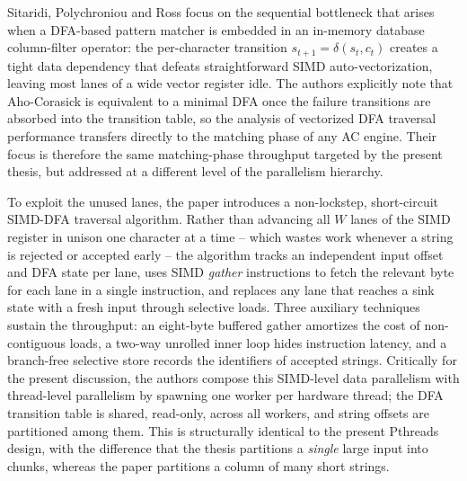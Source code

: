 
Sitaridi, Polychroniou and Ross \cite{Sitaridi2016SIMD} focus on the sequential bottleneck that arises when a DFA-based pattern matcher is embedded in an in-memory database column-filter operator: the per-character transition $s_{t+1} = \delta(s_t, c_t)$ creates a tight data dependency that defeats straightforward SIMD auto-vectorization, leaving most lanes of a wide vector register idle. The authors explicitly note that Aho-Corasick is equivalent to a minimal DFA once the failure transitions are absorbed into the transition table, so the analysis of vectorized DFA traversal performance transfers directly to the matching phase of any AC engine. Their focus is therefore the same matching-phase throughput targeted by the present thesis, but addressed at a different level of the parallelism hierarchy.

To exploit the unused lanes, the paper introduces a non-lockstep, short-circuit SIMD-DFA traversal algorithm. Rather than advancing all $W$ lanes of the SIMD register in unison one character at a time -- which wastes work whenever a string is rejected or accepted early -- the algorithm tracks an independent input offset and DFA state per lane, uses SIMD \emph{gather} instructions to fetch the relevant byte for each lane in a single instruction, and replaces any lane that reaches a sink state with a fresh input through selective loads. Three auxiliary techniques sustain the throughput: an eight-byte buffered gather amortizes the cost of non-contiguous loads, a two-way unrolled inner loop hides instruction latency, and a branch-free selective store records the identifiers of accepted strings. Critically for the present discussion, the authors compose this SIMD-level data parallelism with thread-level parallelism by spawning one worker per hardware thread; the DFA transition table is shared, read-only, across all workers, and string offsets are partitioned among them. This is structurally identical to the present Pthreads design, with the difference that the thesis partitions a \emph{single} large input into chunks, whereas the paper partitions a column of many short strings.

